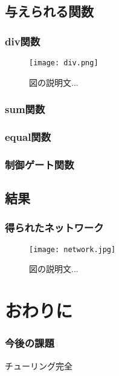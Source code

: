 \documentclass[exploratorypaper]{jsaiart} %
\begin{document}
\subsection{与えられる関数}
\subsubsection{div関数}
\begin{figure*}[t]
    \begin{center}
        \texttt{[image: div.png]}
    \end{center}
    \capwidth=50mm %
    \caption{図の説明文... }
\end{figure*}

\subsubsection{sum関数}
\subsubsection{equal関数}
\subsubsection{制御ゲート関数}
\subsection{結果}
\subsubsection{得られたネットワーク}

\begin{figure*}[t]
    \begin{center}
        \texttt{[image: network.jpg]}
    \end{center}
    \capwidth=90mm %
    \caption{図の説明文... }
\end{figure*}

\section{おわりに}
\subsubsection{今後の課題}
チューリング完全
\end{document}

